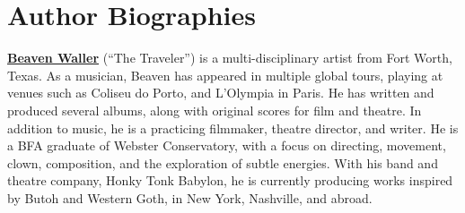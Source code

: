 \documentclass{article}
\begin{document}



\section*{Author Biographies}

\textbf{\href{https://www.beavenwaller.com/}{Beaven Waller}} (``The Traveler'')\label{bio:beaven_waller} is a multi-disciplinary artist from Fort Worth, Texas. As a musician, Beaven has appeared in multiple global tours, playing at venues such as Coliseu do Porto, and L’Olympia in Paris. He has written and produced several albums, along with original scores for film and theatre. In addition to music, he is a practicing filmmaker, theatre director, and writer. He is a BFA graduate of Webster Conservatory, with a focus on directing, movement, clown, composition, and the exploration of subtle energies. With his band and theatre company, Honky Tonk Babylon, he is currently producing works inspired by Butoh and Western Goth, in New York, Nashville, and abroad.
\end{document}
